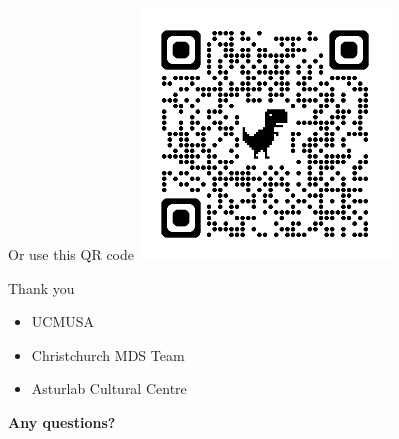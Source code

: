 \documentclass[
  ignorenonframetext,
  aspectratio=169,
]{beamer}
\providecommand{\tightlist}{%
  \setlength{\itemsep}{0pt}\setlength{\parskip}{0pt}}\usepackage{longtable,booktabs,array}
\begin{document}
\begin{frame}{Or use this QR code}
\label{or-use-this-qr-code}
\includegraphics[width=0.5\textwidth,height=\textheight]{figs/mds-qr.png}
\end{frame}

\begin{frame}{Thank you}
\label{thank-you}
\begin{itemize}
\tightlist
\item
  UCMUSA
\item
  Christchurch MDS Team
\item
  Asturlab Cultural Centre
\end{itemize}
\end{frame}

\begin{frame}
\textbf{Any questions?}
\end{frame}
\end{document}
